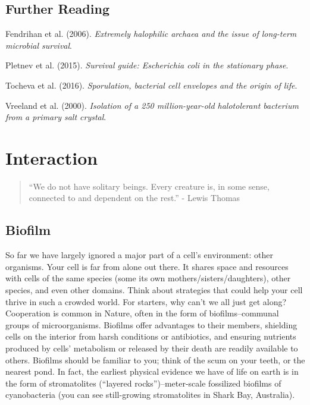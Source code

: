 \documentclass[]{tufte-book}
\begin{document}
\section{Further Reading}\label{further-reading-7}

Fendrihan et al. (2006). \emph{Extremely halophilic archaea and the
issue of long-term microbial survival}.\citep{fendrihan2006}

Pletnev et al. (2015). \emph{Survival guide: Escherichia coli in the
stationary phase}.\citep{pletnev2015}

Tocheva et al. (2016). \emph{Sporulation, bacterial cell envelopes and
the origin of life}.\citep{tocheva2016}

Vreeland et al. (2000). \emph{Isolation of a 250 million-year-old
halotolerant bacterium from a primary salt crystal}.\citep{vreeland2000}

\chapter{Interaction}\label{interaction}

\begin{quote}
``We do not have solitary beings. Every creature is, in some sense,
connected to and dependent on the rest.'' - Lewis Thomas
\citep{thomas1974}
\end{quote}

\section{Biofilm}\label{biofilm}

So far we have largely ignored a major part of a cell's environment:
other organisms. Your cell is far from alone out there. It shares space
and resources with cells of the same species (some its own
mothers/sisters/daughters), other species, and even other domains. Think
about strategies that could help your cell thrive in such a crowded
world. For starters, why can't we all just get along? Cooperation is
common in Nature, often in the form of biofilms--communal groups of
microorganisms. Biofilms offer advantages to their members, shielding
cells on the interior from harsh conditions or antibiotics, and ensuring
nutrients produced by cells' metabolism or released by their death are
readily available to others. Biofilms should be familiar to you; think
of the scum on your teeth, or the nearest pond. In fact, the earliest
physical evidence we have of life on earth is in the form of
stromatolites (``layered rocks'')--meter-scale fossilized biofilms of
cyanobacteria (you can see still-growing stromatolites in Shark Bay,
Australia).
\end{document}
